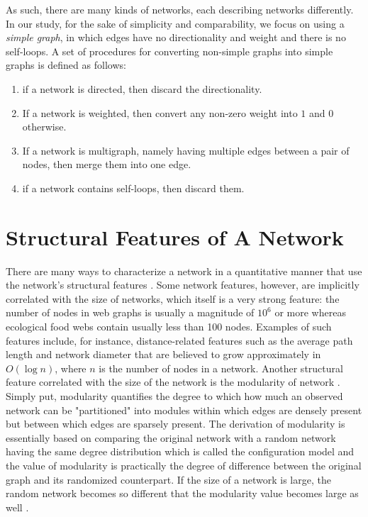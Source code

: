 	As such, there are many kinds of networks, each describing networks differently. In our study, for the sake of simplicity and comparability, we focus on using a \textit{simple graph}, in which edges have no directionality and weight and there is no self-loops. A set of procedures for converting non-simple graphs into simple graphs is defined as follows:
	
	\begin{enumerate}
		\item if a network is directed, then discard the directionality.
		\item If a network is weighted, then convert any non-zero weight into $1$ and $0$ otherwise.
		\item If a network is multigraph, namely having multiple edges between a pair of nodes, then merge them into one edge.
		\item if a network contains self-loops, then discard them.
	\end{enumerate}
	
	\section{Structural Features of A Network}
	There are many ways to characterize a network in a quantitative manner that use the network's structural features \cite{Newman:NetworksIntro,NetworkCharacterizationSurvey}. Some network features, however, are implicitly correlated with the size of networks, which itself is a very strong feature: the number of nodes in web graphs is usually a magnitude of $10^6$ or more whereas ecological food webs contain usually less than 100 nodes. Examples of such features include, for instance, distance-related features such as the average path length and network diameter that are believed to grow approximately in $O(\log n)$, where $n$ is the number of nodes in a network. Another structural feature correlated with the size of the network is the modularity of network \cite{Modularity1}. Simply put, modularity quantifies the degree to which how much an observed network can be "partitioned" into modules within which edges are densely present but between which edges are sparsely present. The derivation of modularity is essentially based on comparing the original network with a random network having the same degree distribution which is called the configuration model and the value of modularity is practically the degree of difference between the original graph and its randomized counterpart. If the size of a network is large, the random network becomes so different that the modularity value becomes large as well \cite{ResolutionLimit, ModularityLimit}.
	
